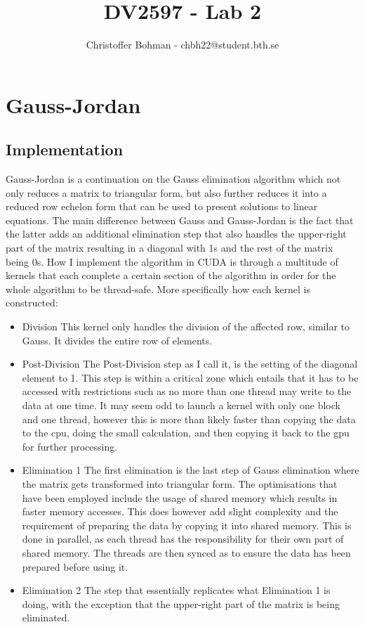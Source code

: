 \documentclass[a4]{article}
\title{DV2597 - Lab 2}
\author{Christoffer Bohman - chbh22@student.bth.se}
\begin{document}
\maketitle

\newpage

\section{Gauss-Jordan}

\subsection{Implementation}

Gauss-Jordan is a continuation on the Gauss elimination algorithm which not only reduces a matrix to triangular form,
but also further reduces it into a reduced row echelon form that can be used to present solutions to linear equations.
The main difference between Gauss and Gauss-Jordan is the fact that the latter adds an additional elimination step that
also handles the upper-right part of the matrix resulting in a diagonal with 1s and the rest of the matrix being 0s.
How I implement the algorithm in CUDA is through a multitude of kernels that each complete a certain section of the algorithm
in order for the whole algorithm to be thread-safe.
More specifically how each kernel is constructed:

\begin{itemize}
	\item Division
	\subitem{\textbf{-}} This kernel only handles the division of the affected row, similar to Gauss. It divides the entire row
	of elements.

	\item Post-Division
	\subitem{\textbf{-}} The Post-Division step as I call it, is the setting of the diagonal element to 1. This step is within a 
	critical zone which entails that it has to be accessed with restrictions such as no more than one thread may write to the data
	at one time. It may seem odd to launch a kernel with only one block and one thread, however this is more than likely faster than
	copying the data to the cpu, doing the small calculation, and then copying it back to the gpu for further processing.

	\item Elimination 1
	\subitem{\textbf{-}} The first elimination is the last step of Gauss elimination where the matrix gets transformed into triangular
	form. The optimisations that have been employed include the usage of shared memory which results in faster memory accesses. This does
	however add slight complexity and the requirement of preparing the data by copying it into shared memory. This is done in parallel, as
	each thread has the responsibility for their own part of shared memory. The threads are then synced as to ensure the data has been
	prepared before using it.

	\item Elimination 2
	\subitem{\textbf{-}} The step that essentially replicates what Elimination 1 is doing, with the exception that the upper-right part
	of the matrix is being eliminated.
\end{itemize}
\end{document}
